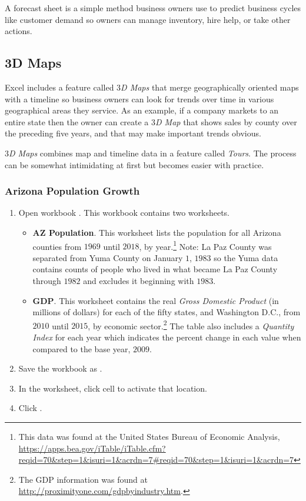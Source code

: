 A forecast sheet is a simple method business owners use to predict business cycles like customer demand so owners can manage inventory, hire help, or take other actions.

\subsection{3D Maps}

Excel includes a feature called \textit{$ 3 $D Maps} that merge geographically oriented maps with a timeline so business owners can look for trends over time in various geographical areas they service. As an example, if a company markets to an entire state then the owner can create a \textit{$ 3 $D Map} that shows sales by county over the preceding five years, and that may make important trends obvious.

\textit{$ 3 $D Maps} combines map and timeline data in a feature called \textit{Tours}. The process can be somewhat intimidating at first but becomes easier with practice.

\subsubsection{Arizona Population Growth}

\begin{enumerate}
	\item Open workbook . This workbook contains two worksheets.
	
	\begin{itemize}
		\item \textbf{AZ Population}. This worksheet lists the population for all Arizona counties from $ 1969 $ until $ 2018 $, by year.\footnote{This data was found at the United States Bureau of Economic Analysis, \url{https://apps.bea.gov/iTable/iTable.cfm?reqid=70&step=1&isuri=1&acrdn=7\#reqid=70&step=1&isuri=1&acrdn=7}} Note: La Paz County was separated from Yuma County on January $ 1 $, $ 1983 $ so the Yuma data contains counts of people who lived in what became La Paz County through $ 1982 $ and excludes it beginning with $ 1983 $.
		\item \textbf{GDP}. This worksheet contains the real \textit{Gross Domestic Product} (in millions of dollars) for each of the fifty states, and Washington D.C., from $ 2010 $ until $ 2015 $, by economic sector.\footnote{The GDP information was found at \url{http://proximityone.com/gdpbyindustry.htm}.} The table also includes a \textit{Quantity Index} for each year which indicates the percent change in each value when compared to the base year, $ 2009 $.
	\end{itemize}
	\item Save the workbook as .
	\item In the  worksheet, click cell  to activate that location.
	\item Click .
\end{enumerate}

